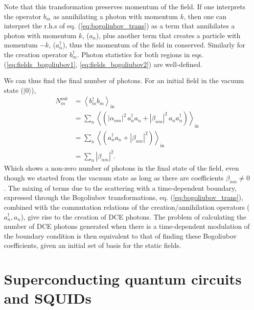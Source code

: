\noindent
Note that this transformation preserves momentum of the field. If one interprets the operator $b_m$ as annihilating a photon with momentum $k$, then one can interpret the r.h.s of eq. (\ref{eq:bogoliubov_trans}) as a term that annihilates a photon with momentum $k$, ($a_n$), plus another term that creates a particle with momentum $-k$, ($a_n^{\dagger}$), thus the momentum of the field in conserved. Similarly for the creation operator $b_m^{\dagger}$.
%
Photon statistics for both regions in eqs. (\ref{eq:fields_bogoliubov1}, \ref{eq:fields_bogoliubov2}) are well-defined.

\noindent
We can thus find the final number of photons. For an initial field in the vacuum state ($\lvert0\rangle$), 
%
\begin{equation}
\begin{aligned}
    N^{\text{out}}_m &= \left\langle b_m^{\dagger}b_m \right\rangle_{\text{in}}\\
    &= \sum_n
    \left\langle
    \left(
    |\alpha_{nm}|^2 \, a_n^{\dagger} a_n + 
    |\beta_{nm}|^2 \, a_n a_n^{\dagger}
    \right)
    \right\rangle_{\text{in}}\\
    &= \sum_n
    \left\langle
    \left(
    a_n^{\dagger} a_n + |\beta_{nm}|^2 
    \right)
    \right\rangle_{\text{in}}\\
    &= \sum_n |\beta_{nm}|^2.
\end{aligned}
\end{equation}
%
Which shows a non-zero number of photons in the final state of the field, even though we started from the vacuum state as long as there are coefficients $\beta_{nm} \neq 0$. The mixing of terms due to the scattering with a time-dependent boundary, expressed through the Bogoliubov transformations, eq. (\ref{eq:bogoliubov_trans}), combined with the commutation relations of the creation/annihilation operators ($a_n^{\dagger}, a_n $), give rise to the creation of DCE photons. The problem of calculating the number of DCE photons generated when there is a time-dependent modulation of the boundary condition is then equivalent to that of finding these Bogoliubov coefficients, given an initial set of basis for the static fields. 


\section{Superconducting quantum circuits and SQUIDs}\label{sec:SC_and_SQUIDs}

